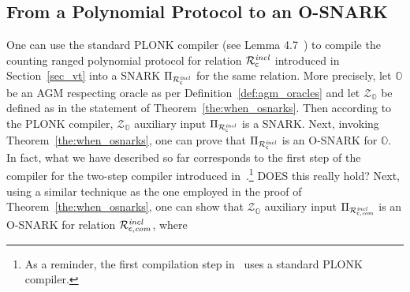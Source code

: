 \subsection{From a Polynomial Protocol to an O-SNARK}
\label{sec:interesting}
\noindent One can use the standard PLONK compiler (see Lemma 4.7~\cite{plonk}) to compile the 
counting ranged polynomial protocol for relation $\mathcal{R}^{\mathit{incl}}_{\mathsf{c}}$ introduced in Section~\ref{sec_vt} 
into a SNARK $\Pi_{\mathcal{R}^{\mathit{incl}}_{\mathsf{c}}}$ for the same relation. More precisely, let $\mathbb{O}$ be an 
AGM respecting oracle as per Definition~\ref{def:agm_oracles} and let $\mathcal{Z}_{\mathbb{O}}$ be defined as in the statement of Theorem~\ref{the:when_osnarks}. 
Then according to the PLONK compiler, $\mathcal{Z}_{\mathbb{O}}$ auxiliary input $\Pi_{\mathcal{R}^{\mathit{incl}}_{\mathsf{c}}}$ is a SNARK.
Next, invoking Theorem~\ref{the:when_osnarks}, one can prove that $\Pi_{\mathcal{R}^{\mathit{incl}}_{\mathsf{c}}}$ is an O-SNARK for $\mathbb{O}$. \\

\noindent In fact, what we have described so far corresponds to the first step of the compiler for the two-step compiler 
introduced in~\cite{LC_paper}.\footnote{As a reminder, the first compilation step in~\cite{LC_paper} uses a standard PLONK compiler.}
{\color{red} DOES this really hold?} Next, using a similar technique as the one employed in the proof of Theorem~\ref{the:when_osnarks}, one can show that 
$\mathcal{Z}_{\mathbb{O}}$ auxiliary input $\Pi_{\mathcal{R}^{\mathit{incl}}_{\mathsf{c},\mathit{com}}}$ is an O-SNARK for relation $\mathcal{R}^{\mathit{incl}}_{\mathsf{c},\mathit{com}}$, where



